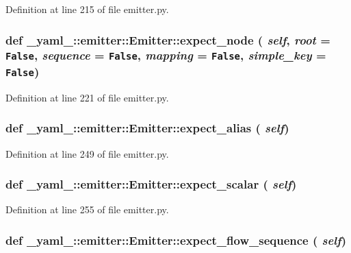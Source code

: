 Definition at line 215 of file emitter.py.
\subsubsection{\setlength{\rightskip}{0pt plus 5cm}def \_\-yaml\_\-::emitter::Emitter::expect\_\-node ( {\em self},  {\em root} = {\tt False},  {\em sequence} = {\tt False},  {\em mapping} = {\tt False},  {\em simple\_\-key} = {\tt False})}\label{class__yaml___1_1emitter_1_1Emitter_64a6629c9a3b8a18164766035c32cac9}




Definition at line 221 of file emitter.py.
\subsubsection{\setlength{\rightskip}{0pt plus 5cm}def \_\-yaml\_\-::emitter::Emitter::expect\_\-alias ( {\em self})}\label{class__yaml___1_1emitter_1_1Emitter_cf8e94cbe0998e6d162a3ebee1684e1a}




Definition at line 249 of file emitter.py.
\subsubsection{\setlength{\rightskip}{0pt plus 5cm}def \_\-yaml\_\-::emitter::Emitter::expect\_\-scalar ( {\em self})}\label{class__yaml___1_1emitter_1_1Emitter_3ee9a02974d09bc22f10cc01f0be9170}




Definition at line 255 of file emitter.py.
\subsubsection{\setlength{\rightskip}{0pt plus 5cm}def \_\-yaml\_\-::emitter::Emitter::expect\_\-flow\_\-sequence ( {\em self})}\label{class__yaml___1_1emitter_1_1Emitter_6c501cd05ef782a0c0b6d7f8654c786e}





